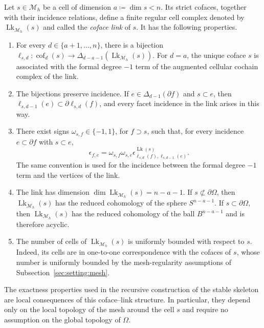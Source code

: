 \documentclass[a4paper,11pt]{article}
\theoremstyle{definition}
\newcommand{\Mh}{\mathcal{M}_h}
\newcommand{\FM}[1]{\Delta_{#1}}
\newcommand{\cof}[1]{\operatorname{cof}_{#1}}
\begin{document}
Let $s\in\Mh$ be a cell of dimension $a\coloneqq\dim s<n$.
Its strict cofaces, together with their incidence relations, define a finite regular cell complex denoted by $\operatorname{Lk}_{\Mh}(s)$ and called the \emph{coface link} of $s$.
It has the following properties.

\begin{enumerate}

\item For every $d\in\{a+1,\ldots,n\}$, there is a bijection $\ell_{s,d}:\cof{d}(s)\longrightarrow\FM{d-a-1}(\operatorname{Lk}_{\Mh}(s))$.
For $d=a$, the unique coface $s$ is associated with the formal degree $-1$ term of the augmented cellular cochain complex of the link.

\item The bijections preserve incidence.
If $e\in\FM{d-1}(\partial f)$ and $s\subset e$, then $\ell_{s,d-1}(e)\subset\partial\ell_{s,d}(f)$, and every facet incidence in the link arises in this way.

\item There exist signs $\omega_{s,f}\in\{-1,1\}$, for $f\supset s$, such that, for every incidence $e\subset\partial f$ with $s\subset e$,
\begin{equation}\label{eq:link.incidence.compatibility}
  \epsilon_{f,e}
  =
  \omega_{s,f}\omega_{s,e}
  \epsilon^{\operatorname{Lk}(s)}
  _{\ell_{s,d}(f),\ell_{s,d-1}(e)}.
\end{equation}
The same convention is used for the incidence between the formal degree $-1$ term and the vertices of the link.

\item The link has dimension $\dim\operatorname{Lk}_{\Mh}(s)=n-a-1$.
If $s\not\subset\partial\Omega$, then $\operatorname{Lk}_{\Mh}(s)$ has the reduced cohomology of the sphere $S^{n-a-1}$.
If $s\subset\partial\Omega$, then $\operatorname{Lk}_{\Mh}(s)$ has the reduced cohomology of the ball $B^{n-a-1}$ and is therefore acyclic.

\item The number of cells of $\operatorname{Lk}_{\Mh}(s)$ is uniformly bounded with respect to $s$.
Indeed, its cells are in one-to-one correspondence with the cofaces of $s$, whose number is uniformly bounded by the mesh-regularity assumptions of Subsection~\ref{sec:setting:mesh}.

\end{enumerate}

The exactness properties used in the recursive construction of the stable skeleton are local consequences of this coface--link structure.
In particular, they depend only on the local topology of the mesh around the cell $s$ and require no assumption on the global topology of $\Omega$.
\end{document}
